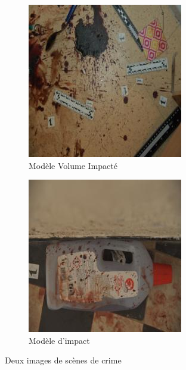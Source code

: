 \begin{figure}[ht]
    \centering
    \begin{subfigure}{0.40\linewidth}
        \centering
        \includegraphics[width=\linewidth]{../asset/data_real/12.jpg}
        \caption{Modèle Volume Impacté}
    \end{subfigure}
    \begin{subfigure}{0.40\linewidth}
        \centering
        \includegraphics[width=\linewidth]{../asset/data_real/15.jpg}
        \caption{Modèle d'impact}
    \end{subfigure}
    \caption{Deux images de scènes de crime}
    \label{fig: reals images}
\end{figure}


